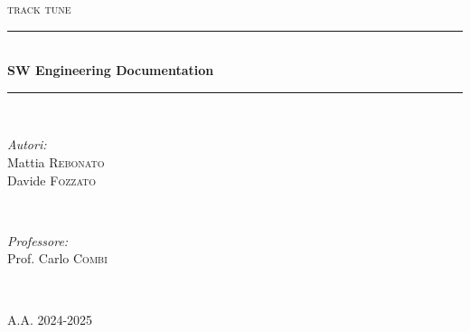 \begin{titlepage}
    $ $
    \vspace{5pt}
    \newcommand{\HRule}{\rule{\linewidth}{0.5mm}}
    \begin{center}
    \textsc{\normalsize track tune}\\[1cm]
    \end{center}
    
    \center
     
    
    \HRule \\[0.4cm]
    { \huge \bfseries SW Engineering Documentation}\\[0.4cm] %
    \HRule \\[1.5cm]
     
    
    \begin{minipage}{0.4\textwidth}
    \begin{flushleft} \large
    \emph{Autori:}\\
    Mattia \textsc{Rebonato} \\
    Davide \textsc{Fozzato}\\
    \end{flushleft}
    \end{minipage}
    ~
    \begin{minipage}{0.4\textwidth}
    \begin{flushright} \large
    \emph{Professore:} \\
    Prof. Carlo \textsc{Combi}
    \end{flushright}
    \end{minipage}\\[2cm]
    
    \vspace{250pt}
    
    \textsc{\normalsize A.A. 2024-2025}\\[0.5cm]
    
    \vfill %
    \end{titlepage}